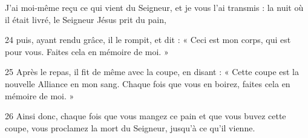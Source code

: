 J’ai moi-même reçu ce qui vient du Seigneur, et je vous l’ai transmis : la nuit où il était livré, le Seigneur Jésus prit du pain,

24 puis, ayant rendu grâce, il le rompit, et dit : « Ceci est mon corps, qui est pour vous. Faites cela en mémoire de moi. »

25 Après le repas, il fit de même avec la coupe, en disant : « Cette coupe est la nouvelle Alliance en mon sang. Chaque fois que vous en boirez, faites cela en mémoire de moi. »

26 Ainsi donc, chaque fois que vous mangez ce pain et que vous buvez cette coupe, vous proclamez la mort du Seigneur, jusqu’à ce qu’il vienne.